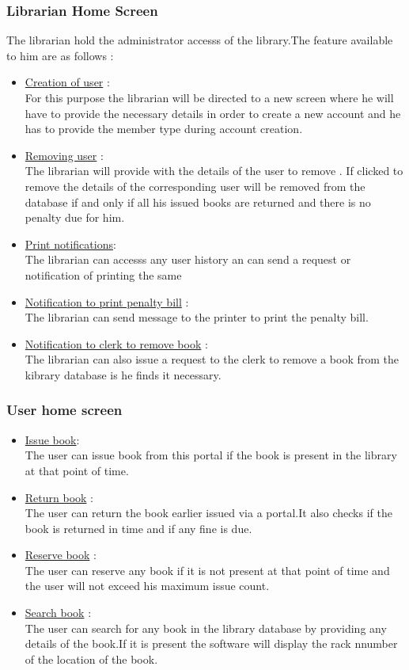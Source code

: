 \documentclass[a4paper]{article}
\begin{document}
\subsubsection*{Librarian Home Screen}
The librarian hold the administrator accesss of the library.The feature available to him are as follows :
\begin{itemize}
\item \underline{Creation of user} :\\
For this purpose the librarian will be directed to a new screen where he will have to provide the necessary details in order to create a new account and he has to provide the member type during account creation.
\item \underline{Removing user} : \\
The librarian will provide with the details of the user to remove . If clicked to remove the details of the corresponding user will be removed from the database if and only if all his issued books are returned and there is no penalty due for him.
\item \underline{Print notifications}:\\ The librarian can accesss any user history an can send a request or notification of printing the same
\item \underline{Notification to print penalty bill} :\\ The librarian can send message to the printer to print the penalty bill.
\item \underline{Notification to clerk to remove book} :\\
The librarian can also issue a request to the clerk to remove a book from the kibrary database is he finds it necessary.
\end{itemize}

\subsubsection*{User home screen}
\begin{itemize}
\item \underline{Issue book}:\\
The user can issue book from this portal if the book is present in the library at that point of time.
\item \underline{Return book} :\\ The user can return the book earlier issued via a portal.It also checks if the book is returned in time and if any fine is due.
\item \underline{Reserve book} :\\ The user can reserve any book if it is not present at that point of time and the user will not exceed his maximum issue count.
\item \underline{Search book} :\\ The user can search for any book in the library database by providing any details of the book.If it is present the software will display the rack nnumber of the location of the book.

\end{itemize}
\end{document}

